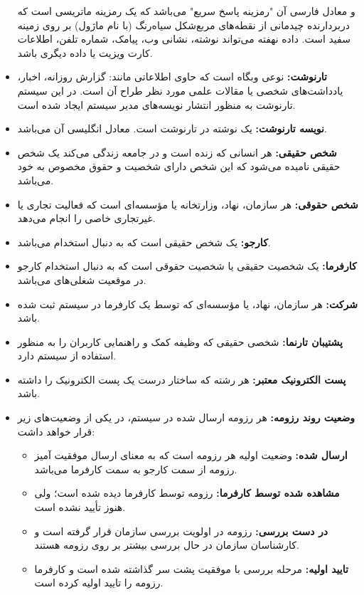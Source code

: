 \documentclass[12pt]{article}
\begin{document}
\begin{itemize}
		  و معادل فارسی آن "رمزینه پاسخ سریع" می‌باشد که یک رمزینه ماتریسی است که دربردارنده چیدمانی از نقطه‌های مربع‌شکل سیاه‌رنگ (با نام ماژول) بر روی زمینه سفید است. داده نهفته می‌تواند نوشته، نشانی وب، پیامک، شماره تلفن، اطلاعات کارت ویزیت یا داده دیگری باشد.
		\item
		\textbf{تارنوشت:}
		  نوعی وبگاه است که حاوی اطلاعاتی مانند: گزارش روزانه، اخبار، یادداشت‌های شخصی یا مقالات علمی مورد نظر طراح آن است. در این سیستم تارنوشت به منظور انتشار نویسه‌های مدیر سیستم ایجاد شده است.
		\item
		\textbf{نویسه‌ تارنوشت:}
		یک نوشته در تارنوشت است. معادل انگلیسی آن
		 می‌باشد.
		\item
		\textbf{شخص حقیقی:}
		 هر انسانی که زنده است و در جامعه زندگی می‌کند یک شخص حقیقی نامیده می‌شود که این شخص دارای شخصیت و حقوق مخصوص به خود می‌باشد.
		\item
		\textbf{شخص حقوقی:}
		 هر سازمان، نهاد، وزارتخانه یا مؤسسه‌ای است که فعالیت تجاری یا غیر‌تجاری خاصی را انجام می‌دهد.
		\item
		\textbf{کارجو:}
		 یک شخص حقیقی است که به دنبال استخدام می‌باشد.
		\item
		\textbf{کارفرما:}
		 یک شخصیت حقیقی یا شخصیت حقوقی است که به دنبال استخدام کارجو در موقعیت شغلی‌های  می‌باشد.
		\item
		\textbf{شرکت:}
		 هر سازمان، نهاد، یا مو‌ٔسسه‌ای که توسط یک کارفرما در سیستم ثبت شده باشد.
		\item
		\textbf{پشتیبان تارنما:}
		شخصی حقیقی که وظیفه کمک و راهنمایی کاربران را به منظور استفاده از سیستم دارد.
		\item
		\textbf{پست الکترونیک معتبر:}
		 هر رشته که ساختار درست یک پست الکترونیک را داشته باشد.
		\item
		\textbf{وضعیت روند رزومه:}
		هر رزومه ارسال شده در سیستم، در یکی از وضعیت‌های زیر قرار خواهد داشت:
		\begin{itemize}
			\item
			\textbf{ارسال شده:}
			وضعیت اولیه هر رزومه است که به معنای ارسال موفقیت آمیز رزومه از سمت کارجو به سمت کارفرما می‌باشد.
			\item
			\textbf{‌مشاهده شده توسط کارفرما:}
			رزومه توسط کارفرما دیده شده است؛ ولی هنوز تأیید نشده است.
			\item
			\textbf{در دست بررسی:}
			رزومه در اولویت بررسی سازمان قرار گرفته است و کارشناسان سازمان در حال بررسی بیشتر بر روی رزومه هستند.
			\item
			\textbf{تایید اولیه:}
			 مرحله بررسی با موفقیت پشت سر گذاشته شده است و کارفرما رزومه را تایید اولیه کرده است.

\end{itemize}
\end{itemize}
\end{document}
